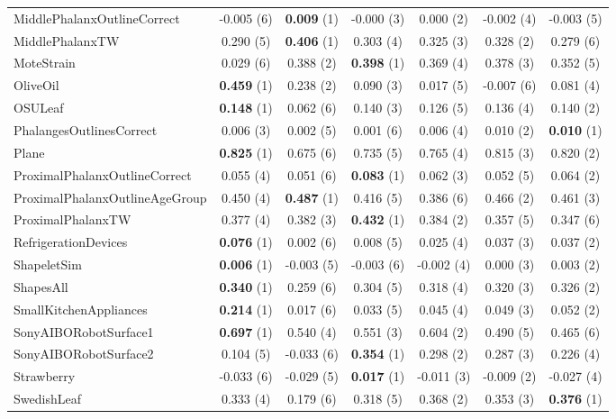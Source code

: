\begin{table}[ht]
\begin{adjustbox}{width=\textwidth}
\begin{tabular}{lcccccc}
    MiddlePhalanxOutlineCorrect & -0.005 (6) & \textbf{0.009} (1) & -0.000 (3) & 0.000 (2) & -0.002 (4) & -0.003 (5) \\
    MiddlePhalanxTW & 0.290 (5) & \textbf{0.406} (1) & 0.303 (4) & 0.325 (3) & 0.328 (2) & 0.279 (6) \\
    MoteStrain & 0.029 (6) & 0.388 (2) & \textbf{0.398} (1) & 0.369 (4) & 0.378 (3) & 0.352 (5) \\
    OliveOil & \textbf{0.459} (1) & 0.238 (2) & 0.090 (3) & 0.017 (5) & -0.007 (6) & 0.081 (4) \\
    OSULeaf & \textbf{0.148} (1) & 0.062 (6) & 0.140 (3) & 0.126 (5) & 0.136 (4) & 0.140 (2) \\
    PhalangesOutlinesCorrect & 0.006 (3) & 0.002 (5) & 0.001 (6) & 0.006 (4) & 0.010 (2) & \textbf{0.010} (1) \\
    Plane & \textbf{0.825} (1) & 0.675 (6) & 0.735 (5) & 0.765 (4) & 0.815 (3) & 0.820 (2) \\
    ProximalPhalanxOutlineCorrect & 0.055 (4) & 0.051 (6) & \textbf{0.083} (1) & 0.062 (3) & 0.052 (5) & 0.064 (2) \\
    ProximalPhalanxOutlineAgeGroup & 0.450 (4) & \textbf{0.487} (1) & 0.416 (5) & 0.386 (6) & 0.466 (2) & 0.461 (3) \\
    ProximalPhalanxTW & 0.377 (4) & 0.382 (3) & \textbf{0.432} (1) & 0.384 (2) & 0.357 (5) & 0.347 (6) \\
    RefrigerationDevices & \textbf{0.076} (1) & 0.002 (6) & 0.008 (5) & 0.025 (4) & 0.037 (3) & 0.037 (2) \\
    ShapeletSim & \textbf{0.006} (1) & -0.003 (5) & -0.003 (6) & -0.002 (4) & 0.000 (3) & 0.003 (2) \\
    ShapesAll & \textbf{0.340} (1) & 0.259 (6) & 0.304 (5) & 0.318 (4) & 0.320 (3) & 0.326 (2) \\
    SmallKitchenAppliances & \textbf{0.214} (1) & 0.017 (6) & 0.033 (5) & 0.045 (4) & 0.049 (3) & 0.052 (2) \\
    SonyAIBORobotSurface1 & \textbf{0.697} (1) & 0.540 (4) & 0.551 (3) & 0.604 (2) & 0.490 (5) & 0.465 (6) \\
    SonyAIBORobotSurface2 & 0.104 (5) & -0.033 (6) & \textbf{0.354} (1) & 0.298 (2) & 0.287 (3) & 0.226 (4) \\
    Strawberry & -0.033 (6) & -0.029 (5) & \textbf{0.017} (1) & -0.011 (3) & -0.009 (2) & -0.027 (4) \\
    SwedishLeaf & 0.333 (4) & 0.179 (6) & 0.318 (5) & 0.368 (2) & 0.353 (3) & \textbf{0.376} (1) \\

\end{tabular}
\end{adjustbox}
\end{table}
